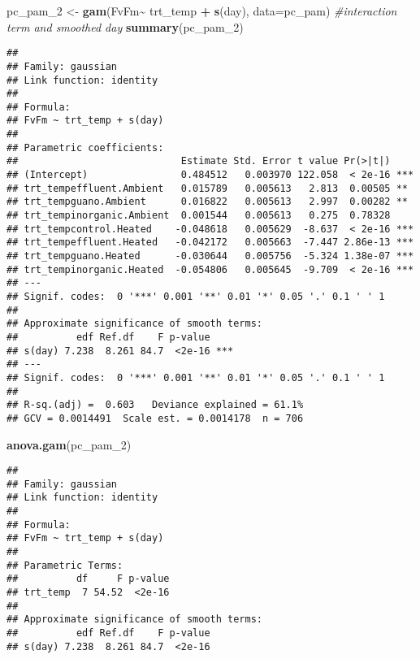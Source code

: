 \documentclass[
]{article}
\newenvironment{Shaded}{\begin{snugshade}}{\end{snugshade}}
\newcommand{\AttributeTok}[1]{\textcolor[rgb]{0.13,0.29,0.53}{#1}}
\newcommand{\CommentTok}[1]{\textcolor[rgb]{0.56,0.35,0.01}{\textit{#1}}}
\newcommand{\FunctionTok}[1]{\textcolor[rgb]{0.13,0.29,0.53}{\textbf{#1}}}
\newcommand{\NormalTok}[1]{#1}
\newcommand{\OtherTok}[1]{\textcolor[rgb]{0.56,0.35,0.01}{#1}}
\newcommand{\SpecialCharTok}[1]{\textcolor[rgb]{0.81,0.36,0.00}{\textbf{#1}}}
\begin{document}
\begin{Shaded}
\begin{Highlighting}[]
\NormalTok{pc\_pam\_2 }\OtherTok{\textless{}{-}} \FunctionTok{gam}\NormalTok{(FvFm}\SpecialCharTok{\textasciitilde{}}\NormalTok{ trt\_temp }\SpecialCharTok{+} \FunctionTok{s}\NormalTok{(day), }\AttributeTok{data=}\NormalTok{pc\_pam) }\CommentTok{\#interaction term and smoothed day}
\FunctionTok{summary}\NormalTok{(pc\_pam\_2)}
\end{Highlighting}
\end{Shaded}

\begin{verbatim}
## 
## Family: gaussian 
## Link function: identity 
## 
## Formula:
## FvFm ~ trt_temp + s(day)
## 
## Parametric coefficients:
##                            Estimate Std. Error t value Pr(>|t|)    
## (Intercept)                0.484512   0.003970 122.058  < 2e-16 ***
## trt_tempeffluent.Ambient   0.015789   0.005613   2.813  0.00505 ** 
## trt_tempguano.Ambient      0.016822   0.005613   2.997  0.00282 ** 
## trt_tempinorganic.Ambient  0.001544   0.005613   0.275  0.78328    
## trt_tempcontrol.Heated    -0.048618   0.005629  -8.637  < 2e-16 ***
## trt_tempeffluent.Heated   -0.042172   0.005663  -7.447 2.86e-13 ***
## trt_tempguano.Heated      -0.030644   0.005756  -5.324 1.38e-07 ***
## trt_tempinorganic.Heated  -0.054806   0.005645  -9.709  < 2e-16 ***
## ---
## Signif. codes:  0 '***' 0.001 '**' 0.01 '*' 0.05 '.' 0.1 ' ' 1
## 
## Approximate significance of smooth terms:
##          edf Ref.df    F p-value    
## s(day) 7.238  8.261 84.7  <2e-16 ***
## ---
## Signif. codes:  0 '***' 0.001 '**' 0.01 '*' 0.05 '.' 0.1 ' ' 1
## 
## R-sq.(adj) =  0.603   Deviance explained = 61.1%
## GCV = 0.0014491  Scale est. = 0.0014178  n = 706
\end{verbatim}

\begin{Shaded}
\begin{Highlighting}[]
\FunctionTok{anova.gam}\NormalTok{(pc\_pam\_2)}
\end{Highlighting}
\end{Shaded}

\begin{verbatim}
## 
## Family: gaussian 
## Link function: identity 
## 
## Formula:
## FvFm ~ trt_temp + s(day)
## 
## Parametric Terms:
##          df     F p-value
## trt_temp  7 54.52  <2e-16
## 
## Approximate significance of smooth terms:
##          edf Ref.df    F p-value
## s(day) 7.238  8.261 84.7  <2e-16
\end{verbatim}
\end{document}
